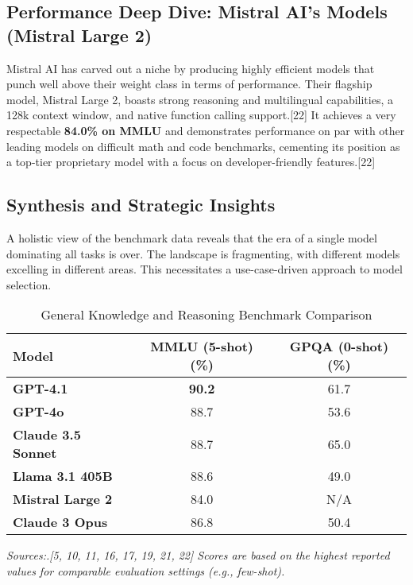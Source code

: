 \documentclass[12pt, a4paper]{article}
\begin{document}
\subsection{Performance Deep Dive: Mistral AI's Models (Mistral Large 2)}

Mistral AI has carved out a niche by producing highly efficient models that punch well above their weight class in terms of performance. Their flagship model, Mistral Large 2, boasts strong reasoning and multilingual capabilities, a 128k context window, and native function calling support.[22] It achieves a very respectable \textbf{84.0\% on MMLU} and demonstrates performance on par with other leading models on difficult math and code benchmarks, cementing its position as a top-tier proprietary model with a focus on developer-friendly features.[22]

\subsection{Synthesis and Strategic Insights}

A holistic view of the benchmark data reveals that the era of a single model dominating all tasks is over. The landscape is fragmenting, with different models excelling in different areas. This necessitates a use-case-driven approach to model selection.

\begin{table}[h!]
\centering
\caption{General Knowledge and Reasoning Benchmark Comparison}
\label{tab:reasoning_bench}
\begin{tabular}{@{}lcc@{}}
\toprule
\textbf{Model} & \textbf{MMLU (5-shot) (\%)} & \textbf{GPQA (0-shot) (\%)} \\
\midrule
\textbf{GPT-4.1} & \textbf{90.2} & 61.7 \\
\textbf{GPT-4o} & 88.7 & 53.6 \\
\textbf{Claude 3.5 Sonnet} & 88.7 & 65.0 \\
\textbf{Llama 3.1 405B} & 88.6 & 49.0 \\
\textbf{Mistral Large 2} & 84.0 & N/A \\
\textbf{Claude 3 Opus} & 86.8 & 50.4 \\
\bottomrule
\end{tabular}
\end{table}
\textit{Sources:.[5, 10, 11, 16, 17, 19, 21, 22] Scores are based on the highest reported values for comparable evaluation settings (e.g., few-shot).}
\end{document}
